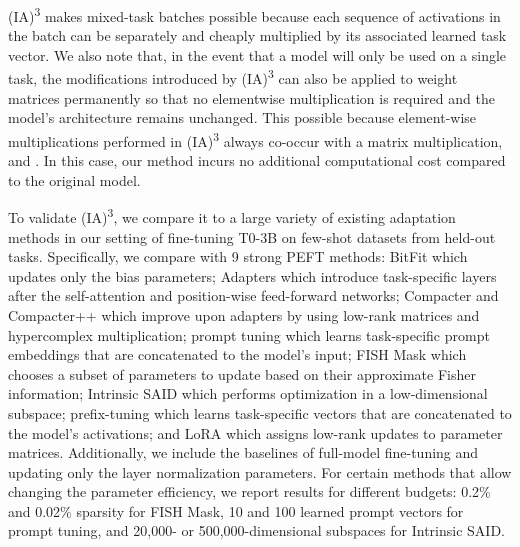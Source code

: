 \documentclass{article}
\newcommand{\ia}{{\fontfamily{lmtt}\selectfont (IA)\textsuperscript{3}}\xspace}
\begin{document}
\ia makes mixed-task batches possible because each sequence of activations in the batch can be separately and cheaply multiplied by its associated learned task vector.
We also note that, in the event that a model will only be used on a single task, the modifications introduced by \ia can also be applied to weight matrices permanently so that no elementwise multiplication is required and the model's architecture remains unchanged.
This possible because element-wise multiplications performed in \ia always co-occur with a matrix multiplication, and .
In this case, our method incurs no additional computational cost compared to the original model.

To validate \ia, we compare it to a large variety of existing adaptation methods in our setting of fine-tuning T0-3B on few-shot datasets from held-out tasks.
Specifically, we compare with 9 strong PEFT methods: BitFit \cite{zaken2021bitfit} which updates only the bias parameters; Adapters \cite{Houlsby2019ParameterEfficientTL} which introduce task-specific layers after the self-attention and position-wise feed-forward networks; Compacter and Compacter++ \cite{mahabadi2021compacter} which improve upon adapters by using low-rank matrices and hypercomplex multiplication; prompt tuning \cite{lester2021power} which learns task-specific prompt embeddings that are concatenated to the model's input; FISH Mask \cite{sung2021training} which chooses a subset of parameters to update based on their approximate Fisher information; Intrinsic SAID \cite{aghajanyan2020intrinsic} which performs optimization in a low-dimensional subspace; prefix-tuning \cite{li2021prefix} which learns task-specific vectors that are concatenated to the model's activations; and LoRA \cite{hu2021lora} which assigns low-rank updates to parameter matrices.
Additionally, we include the baselines of full-model fine-tuning and updating only the layer normalization parameters.
For certain methods that allow changing the parameter efficiency, we report results for different budgets: 0.2\% and 0.02\% sparsity for FISH Mask, 10 and 100 learned prompt vectors for prompt tuning, and 20,000- or 500,000-dimensional subspaces for Intrinsic SAID.
\end{document}
